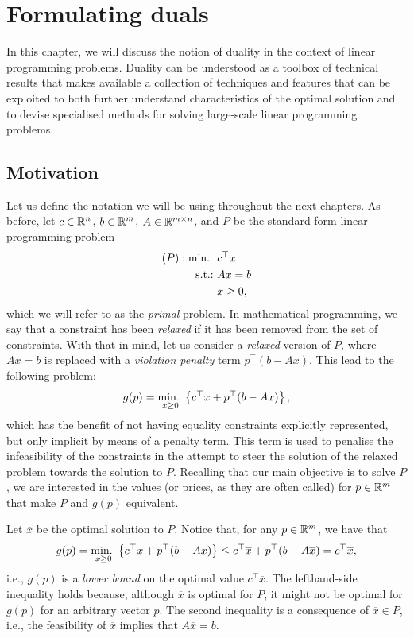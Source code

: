 \section{Formulating duals}

In this chapter, we will discuss the notion of duality in the context of linear programming problems. Duality can be understood as a toolbox of technical results that makes available a collection of techniques and features that can be exploited to both further understand characteristics of the optimal solution and to devise specialised methods for solving large-scale linear programming problems.


\subsection{Motivation}

Let us define the notation we will be using throughout the next chapters. As before, let $c \in \mathbb{R}^n$, $b \in \mathbb{R}^m$, $A \in \mathbb{R}^{m \times n}$, and $P$ be the standard form linear programming problem
%
\begin{align*}
	(P) : \mathop{\text{min.~}} \ & c^\top x \\
	\mathop{\text{s.t.:~}} 	  & Ax = b \\
		  & x \geq 0,   
\end{align*}
%
which we will refer to as the \emph{primal} problem.  In mathematical programming, we say that a constraint has been \emph{relaxed} if it has been removed from the set of constraints. With that in mind, let us consider a \emph{relaxed} version of $P$, where $Ax = b$ is replaced with a \emph{violation penalty} term $p^\top (b - Ax)$. This lead to the following problem:
%
\begin{equation*}
	g(p) = \mathop{\text{min.~}}_{x \geq 0} \left\{ c^\top x + p^\top (b - Ax) \right \},
\end{equation*}
%
which has the benefit of not having equality constraints explicitly represented, but only implicit by means of a penalty term. This term is used to penalise the infeasibility of the constraints in the attempt to steer the solution of the relaxed problem towards the solution to $P$. Recalling that our main objective is to solve $P$, we are interested in the values (or prices, as they are often called) for $p \in \mathbb{R}^m$ that make $P$ and $g(p)$ equivalent.

Let $\overline{x}$ be the optimal solution to $P$. Notice that, for any $p \in \mathbb{R}^m$, we have that
%
\begin{equation*}
	g(p) = \mathop{\text{min.~}}_{x \geq 0} \left\{ c^\top x + p^\top (b - Ax) \right \} \leq c^\top \overline{x} +  p^\top (b - A\overline{x}) = c^\top \overline{x},   
\end{equation*}
%
i.e., $g(p)$ is a \emph{lower bound} on the optimal value $c^\top \overline{x}$. The lefthand-side inequality holds because, although $\overline{x}$ is optimal for $P$, it might not be optimal for $g(p)$ for an arbitrary vector $p$. The second inequality is a consequence of $\overline{x} \in P$, i.e., the feasibility of $\overline{x}$ implies that $A\overline{x} = b$.

